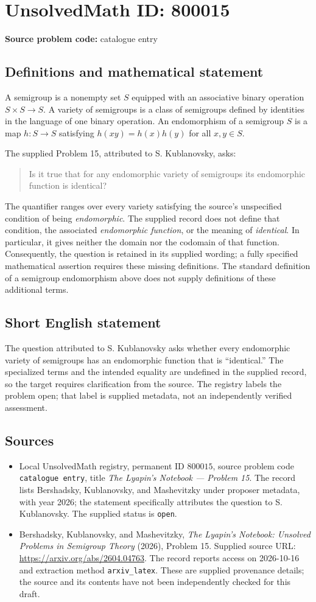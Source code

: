 \documentclass[11pt]{article}
\begin{document}
\section*{UnsolvedMath ID: 800015}
\textbf{Source problem code:} catalogue entry
\subsection{Definitions and mathematical statement}
A semigroup is a nonempty set \(S\) equipped with an associative binary operation \(S\times S\to S\). A variety of semigroups is a class of semigroups defined by identities in the language of one binary operation. An endomorphism of a semigroup \(S\) is a map \(h:S\to S\) satisfying \(h(xy)=h(x)h(y)\) for all \(x,y\in S\).

The supplied Problem 15, attributed to S. Kublanovsky, asks:
\begin{quote}
Is it true that for any endomorphic variety of semigroups its endomorphic function is identical?
\end{quote}
The quantifier ranges over every variety satisfying the source's unspecified condition of being \emph{endomorphic}. The supplied record does not define that condition, the associated \emph{endomorphic function}, or the meaning of \emph{identical}. In particular, it gives neither the domain nor the codomain of that function. Consequently, the question is retained in its supplied wording; a fully specified mathematical assertion requires these missing definitions. The standard definition of a semigroup endomorphism above does not supply definitions of these additional terms.
\subsection{Short English statement}
The question attributed to S. Kublanovsky asks whether every endomorphic variety of semigroups has an endomorphic function that is ``identical.'' The specialized terms and the intended equality are undefined in the supplied record, so the target requires clarification from the source. The registry labels the problem open; that label is supplied metadata, not an independently verified assessment.
\subsection{Sources}
\begin{itemize}
\item Local UnsolvedMath registry, permanent ID \(800015\), source problem code \texttt{catalogue entry}, title \emph{The Lyapin's Notebook --- Problem 15}. The record lists Bershadsky, Kublanovsky, and Mashevitzky under proposer metadata, with year 2026; the statement specifically attributes the question to S. Kublanovsky. The supplied status is \texttt{open}.
\item Bershadsky, Kublanovsky, and Mashevitzky, \emph{The Lyapin's Notebook: Unsolved Problems in Semigroup Theory} (2026), Problem 15. Supplied source URL: \url{https://arxiv.org/abs/2604.04763}. The record reports access on 2026-10-16 and extraction method \texttt{arxiv\_latex}. These are supplied provenance details; the source and its contents have not been independently checked for this draft.
\end{itemize}
\end{document}
